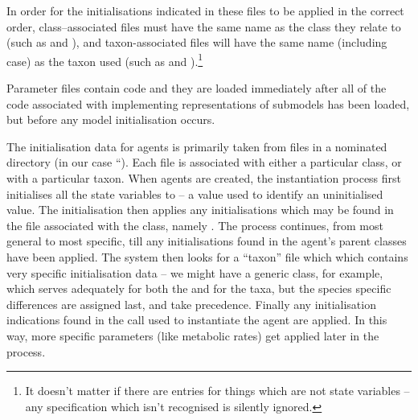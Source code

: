 In order for the initialisations indicated in these files to be
applied in the correct order, class--associated files must have the
same name as the class they relate to (such as  and
), and taxon-associated files will have the same name
(including case) as the taxon used (such as
 and ).\footnote{It doesn't matter if there are
  entries for things which are not state variables -- any specification
  which isn't recognised is silently ignored.}

Parameter files contain \Scheme code and they are loaded
immediately after all of the code associated with implementing
representations of submodels has been loaded, but before any model
initialisation occurs. 

The initialisation data for agents is primarily taken from files in a
nominated directory (in our case ``).  Each file
is associated with either a particular class, or with a particular
taxon.  When agents are created, the instantiation process first
initialises all the state variables to  -- a value
used to identify an uninitialised value.  The initialisation then
applies any initialisations which may be found in the file associated
with the  class, namely .
The process continues, from most general to most specific, till any 
initialisations found in the agent's parent classes have been
applied.  The system then looks for a ``taxon'' file which which
contains very specific initialisation data -- we might have a generic
 class, for example, which serves adequately for both the
 and for the  taxa, but the species
specific differences are assigned last, and take precedence.  Finally any
initialisation indications found in the  call
used to instantiate the agent are applied.  In this way, more specific
parameters (like metabolic rates) get applied later in the process.

